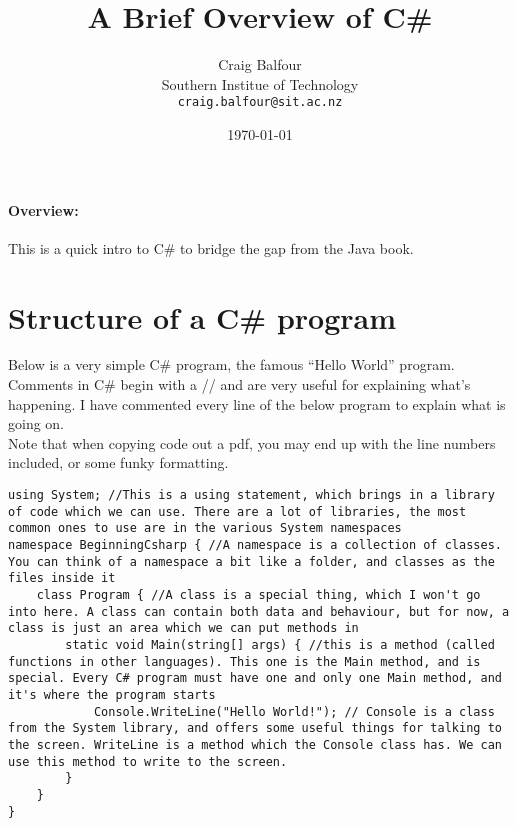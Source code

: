 \documentclass{article}
\begin{document}
\title{A Brief Overview of C\#}
\author{Craig Balfour\\
        Southern Institue of Technology\\
	\texttt{craig.balfour@sit.ac.nz}}
\date{\today}
\maketitle

\paragraph{Overview:}
This is a quick intro to C\# to bridge the gap from the Java book.


\section{Structure of a C\# program}
Below is a very simple C\# program, the famous ``Hello World'' program.\\

Comments in C\# begin with a // and are very useful for explaining what's happening. I have commented every line of the below program to explain what is going on.\\

Note that when copying code out a pdf, you may end up with the line numbers included, or some funky formatting.

\begin{lstlisting}
using System; //This is a using statement, which brings in a library of code which we can use. There are a lot of libraries, the most common ones to use are in the various System namespaces
namespace BeginningCsharp { //A namespace is a collection of classes. You can think of a namespace a bit like a folder, and classes as the files inside it
    class Program { //A class is a special thing, which I won't go into here. A class can contain both data and behaviour, but for now, a class is just an area which we can put methods in
        static void Main(string[] args) { //this is a method (called functions in other languages). This one is the Main method, and is special. Every C# program must have one and only one Main method, and it's where the program starts
            Console.WriteLine("Hello World!"); // Console is a class from the System library, and offers some useful things for talking to the screen. WriteLine is a method which the Console class has. We can use this method to write to the screen.
        }
    }
}
\end{lstlisting}
\end{document}
